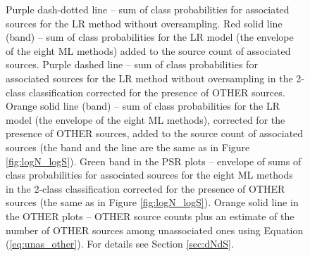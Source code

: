 \begin{figure}[h]
{Purple dash-dotted line -- sum of class probabilities for associated sources for the LR method without oversampling.
Red solid line (band) -- sum of class probabilities for the LR model (the envelope of the eight ML methods) added to the source count of associated sources. 
Purple dashed line -- sum of class probabilities for associated sources for the LR method without oversampling in the 2-class classification corrected for the presence of OTHER sources.
Orange solid line (band) -- sum of class probabilities for the LR model (the envelope of the eight ML methods), corrected for the presence of OTHER sources, added to the source count of associated sources (the band and the line are the same as in Figure \ref{fig:logN_logS}).
Green band in the PSR plots -- envelope of sums of class probabilities for associated sources for the eight ML methods in the 2-class classification corrected for the presence of OTHER sources (the same as in Figure \ref{fig:logN_logS}).
Orange solid line in the OTHER plots -- OTHER source counts plus an estimate of the number of OTHER sources among unassociated ones using Equation (\ref{eq:unas_other}). 
For details see Section \ref{sec:dNdS}.
}  
\label{fig:logN_logS_3classes}
\end{figure}



